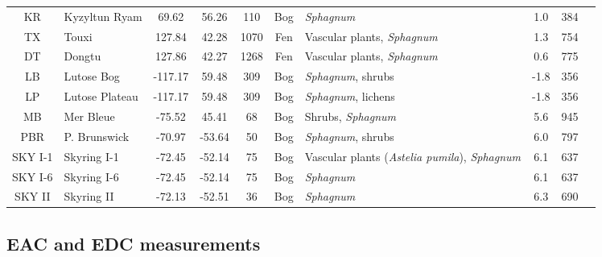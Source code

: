 \documentclass[draft,linenumbers]{agujournal2018}
\begin{document}
\begin{landscape}
\begin{table}
{\begin{tabular}[t]{clcccc>{\raggedright\arraybackslash}p{4cm}cc>{\raggedright\arraybackslash}p{4cm}}
\addlinespace
KR & Kyzyltun Ryam & 69.62 & 56.26 & 110 & Bog & \emph{Sphagnum} & 1.0 & 384 & \citet{Larina.2013}\\
TX & Touxi & 127.84 & 42.28 & 1070 & Fen & Vascular plants, \emph{Sphagnum} & 1.3 & 754 & \\
DT & Dongtu & 127.86 & 42.27 & 1268 & Fen & Vascular plants, \emph{Sphagnum} & 0.6 & 775 & \\
LB & Lutose Bog & -117.17 & 59.48 & 309 & Bog & \emph{Sphagnum}, shrubs & -1.8 & 356 & \citet{Heffernan.2020}\\
LP & Lutose Plateau & -117.17 & 59.48 & 309 & Bog & \emph{Sphagnum}, lichens & -1.8 & 356 & \citet{Heffernan.2020}\\
\addlinespace
MB & Mer Bleue & -75.52 & 45.41 & 68 & Bog & Shrubs, \emph{Sphagnum} & 5.6 & 945 & \citet{Elliott.2012}\\
PBR & P. Brunswick & -70.97 & -53.64 & 50 & Bog & \emph{Sphagnum}, shrubs & 6.0 & 797 & \citet{Broder.2012}\\
SKY I-1 & Skyring I-1 & -72.45 & -52.14 & 75 & Bog & Vascular plants (\emph{Astelia pumila}), \emph{Sphagnum} & 6.1 & 637 & \citet{Mathijssen.2019}\\
SKY I-6 & Skyring I-6 & -72.45 & -52.14 & 75 & Bog & \emph{Sphagnum} & 6.1 & 637 & \citet{Mathijssen.2019}\\
SKY II & Skyring II & -72.13 & -52.51 & 36 & Bog & \emph{Sphagnum} & 6.3 & 690 & \citet{Broder.2012}\\
\bottomrule
\end{tabular}}
\end{table}
\end{landscape}

\subsection{EAC and EDC measurements}
\end{document}
